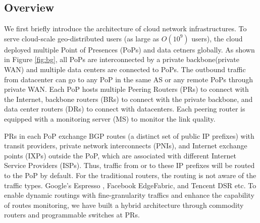 \subsection{Overview}  %
We first briefly introduce the architecture of cloud network infrastructures. To serve cloud-scale geo-distributed users (as large as $O(10^{9})$ users), the cloud deployed multiple Point of Presences (PoPs) and data cetners globally. As shown in Figure \ref{fig:bg}, all PoPs are interconnected by a private backbone(private WAN) and multiple data centers are connected to PoPs. The outbound traffic from datacenter can go to any PoP in the same AS or any remote PoPs through private WAN. Each PoP hosts multiple Peering Routers (PRs) to connect with the Internet, backbone routers (BRs) to connect with the private backbone, and data center routers (DRs) to connect with datacenters. Each peering router is equipped with a monitoring server (MS) to monitor the link quality.

PRs in each PoP exchange BGP routes (a distinct set of public IP prefixes) with transit providers, private network interconnects (PNIs), and Internet exchange points (IXPs) outside the PoP, which are associated with different Internet Service Providers (ISPs). Thus, traffic from or to these IP prefixes will be routed to the PoP by default. For the traditional routers, the routing is not aware of the traffic types. Google’s Espresso \cite{yap2017espresso}, Facebook EdgeFabric\cite{schlinker2017edgefabric}, and Tencent DSR \cite{shao21DSR} etc. To enable dynamic routings with fine-granularity traffics and enhance the capability of routes monitoring, we have built a hybrid architecture through commodity routers and programmable switches at PRs. 



